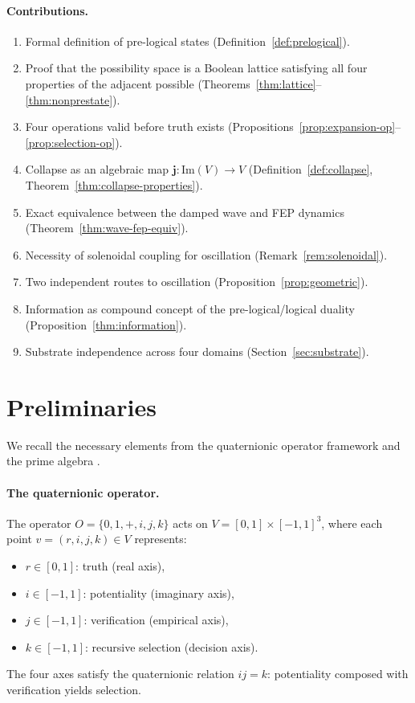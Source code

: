 \documentclass[11pt,a4paper]{article}
\begin{document}
\paragraph{Contributions.}
\begin{enumerate}[nosep]
\item Formal definition of pre-logical states (Definition~\ref{def:prelogical}).
\item Proof that the possibility space is a Boolean lattice satisfying all
  four properties of the adjacent possible
  (Theorems~\ref{thm:lattice}--\ref{thm:nonprestate}).
\item Four operations valid before truth exists
  (Propositions~\ref{prop:expansion-op}--\ref{prop:selection-op}).
\item Collapse as an algebraic map $\mathbf{j}: \mathrm{Im}(V) \to V$
  (Definition~\ref{def:collapse}, Theorem~\ref{thm:collapse-properties}).
\item Exact equivalence between the damped wave and FEP dynamics
  (Theorem~\ref{thm:wave-fep-equiv}).
\item Necessity of solenoidal coupling for oscillation
  (Remark~\ref{rem:solenoidal}).
\item Two independent routes to oscillation
  (Proposition~\ref{prop:geometric}).
\item Information as compound concept of the pre-logical/\allowbreak logical duality
  (Proposition~\ref{thm:information}).
\item Substrate independence across four domains (Section~\ref{sec:substrate}).
\end{enumerate}

\section{Preliminaries}
\label{sec:prelim}

We recall the necessary elements from the quaternionic operator
framework \citep{p11} and the prime algebra \citep{p1}.

\paragraph{The quaternionic operator.}
The operator $O = \{0, 1, +, i, j, k\}$ acts on
$V = [0,1] \times [-1,1]^3$, where each point
$v = (r, i, j, k) \in V$ represents:
\begin{itemize}[nosep]
\item $r \in [0,1]$: truth (real axis),
\item $i \in [-1,1]$: potentiality (imaginary axis),
\item $j \in [-1,1]$: verification (empirical axis),
\item $k \in [-1,1]$: recursive selection (decision axis).
\end{itemize}
The four axes satisfy the quaternionic relation $ij = k$:
potentiality composed with verification yields selection.
\end{document}

